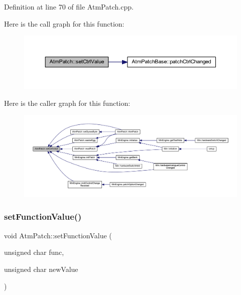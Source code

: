 Definition at line 70 of file Atm\+Patch.\+cpp.

Here is the call graph for this function\+:
\nopagebreak
\begin{figure}[H]
\begin{center}
\leavevmode
\includegraphics[width=350pt]{d9/de1/class_atm_patch_a95fb3ea0dfd3369abe7518da26edb1b5_cgraph}
\end{center}
\end{figure}
Here is the caller graph for this function\+:
\nopagebreak
\begin{figure}[H]
\begin{center}
\leavevmode
\includegraphics[width=350pt]{d9/de1/class_atm_patch_a95fb3ea0dfd3369abe7518da26edb1b5_icgraph}
\end{center}
\end{figure}
\mbox{\label{class_atm_patch_ad2fe7a265755afc95a36752b86b6a7e2}} 
\subsubsection{\texorpdfstring{set\+Function\+Value()}{setFunctionValue()}}
{\footnotesize\ttfamily void Atm\+Patch\+::set\+Function\+Value (\begin{DoxyParamCaption}\item[{unsigned char}]{func,  }\item[{unsigned char}]{new\+Value }\end{DoxyParamCaption})}



